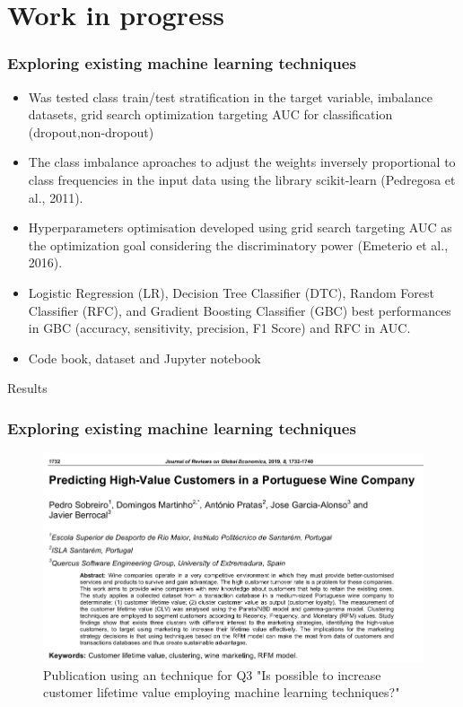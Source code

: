 \documentclass[10pt]{beamer}
\begin{document}
\section{Work in progress}
\begin{frame}
	\frametitle{Exploring existing machine learning techniques}
	\begin{itemize}
		\item Was tested class train/test stratification in the target variable, imbalance datasets, grid search optimization targeting AUC for classification (dropout,non-dropout)
		\item The class imbalance aproaches to adjust the weights inversely proportional to class frequencies in the input data using the library scikit-learn (Pedregosa et al., 2011). 
		\item Hyperparameters optimisation developed using grid search targeting AUC as the optimization goal considering the discriminatory power (Emeterio et al., 2016). 
		\item Logistic Regression (LR), Decision Tree Classifier (DTC), Random Forest Classifier (RFC), and Gradient Boosting Classifier (GBC) best performances in GBC (accuracy, sensitivity, precision, F1 Score) and RFC in AUC.
		\item Code book, dataset and Jupyter notebook \href{https://github.com/pesobreiro/dropoutPredFitness}{\color{red}{code}}
	\end{itemize}
\end{frame}

\begin{frame}[fragile]{Results}
	\frametitle{Exploring existing machine learning techniques}
	\begin{figure}
		\includegraphics[scale=0.4]{../img/pub1.png}
		\caption{Publication using an technique for Q3 "Is possible to increase customer lifetime value employing machine learning techniques?"}
		\label{figure3}
	\end{figure}
\end{frame}
\end{document}
